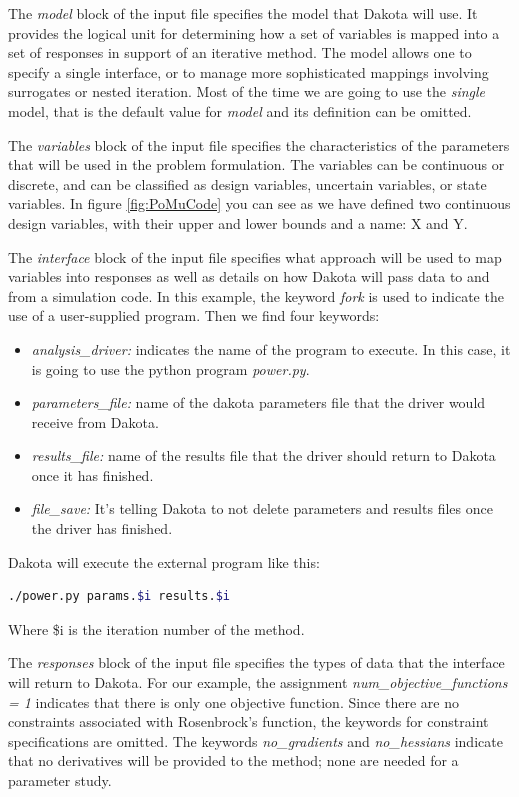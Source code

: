 \documentclass[12pt,a4paper,article]{memoir}
\begin{document}
The \textit{model} block of the input file specifies the model that Dakota will use. It provides the logical unit for determining how a set of variables is mapped into a set of responses in support of an iterative method. The model allows one to specify a single interface, or to manage more sophisticated mappings involving surrogates or nested iteration. 
Most of the time we are going to use the \textit{single} model, that is the default value for \textit{model} and its definition can be omitted.

The \textit{variables} block of the input file specifies the characteristics of the parameters that will be used in the problem formulation. The variables can be continuous or discrete, and can be classified as design variables, uncertain variables, or state variables. In figure \ref{fig:PoMuCode} you can see as we have defined two continuous design variables, with their upper and lower bounds and a name: X and Y.

The \textit{interface} block of the input file specifies what approach will be used to map variables into responses as well as details on how Dakota will pass data to and from a simulation code. In this example, the keyword \textit{fork} is used to indicate the use of a user-supplied program. Then we find four keywords: 
\begin{itemize}
\item \textit{analysis\_driver:} indicates the name of the program to execute. In this case, it is going to use the python program \textit{power.py}. 
\item \textit{parameters\_file:} name of the dakota parameters file that the driver would receive from Dakota.
\item \textit{results\_file:} name of the results file that the driver should return to Dakota once it has finished.
\item \textit{file\_save:} It's telling Dakota to not delete parameters and results files once the driver has finished.
\end{itemize}

Dakota will execute the external program like this:

\begin{lstlisting}[style=MyCodeStyle,language=bash]
./power.py params.$i results.$i
\end{lstlisting}

Where \$i is the iteration number of the method.

The \textit{responses} block of the input file specifies the types of data that the interface will return to Dakota. For our example, the assignment \textit{num\_objective\_functions = 1} indicates that there is only one objective function. Since there are no constraints associated with Rosenbrock's function, the keywords for constraint specifications are omitted. The keywords \textit{no\_gradients} and \textit{no\_hessians} indicate that no
derivatives will be provided to the method; none are needed for a parameter study.
\end{document}
